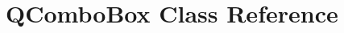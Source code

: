 \hypertarget{classGUI_1_1QtGui_1_1QComboBox}{}\section{Q\+Combo\+Box Class Reference}
\label{classGUI_1_1QtGui_1_1QComboBox}
